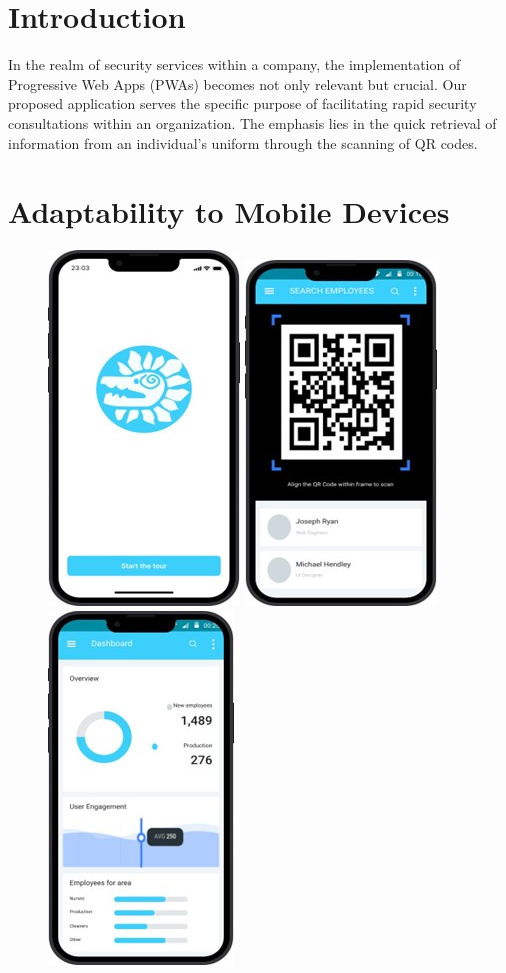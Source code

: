 \documentclass{article}
\begin{document}
	
	
	\newpage
	\tableofcontents
	
	\newpage
	\section{Introduction}
	In the realm of security services within a company, the implementation of Progressive Web Apps (PWAs) becomes not only relevant but crucial. Our proposed application serves the specific purpose of facilitating rapid security consultations within an organization. The emphasis lies in the quick retrieval of information from an individual's uniform through the scanning of QR codes.
	

	\section{Adaptability to Mobile Devices}
	\begin{figure}[h]
		\centering
		\includegraphics[width=0.2\linewidth]{images/1.jpg}
		\hspace{0.05\linewidth}
		\includegraphics[width=0.2\linewidth]{images/2.jpg}
		\hspace{0.05\linewidth}
		\includegraphics[width=0.2\linewidth]{images/3.jpg}
	\end{figure}
	
\end{document}
